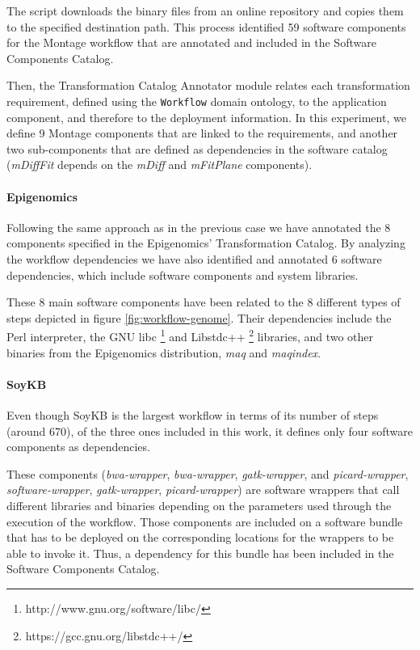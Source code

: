 The script downloads the binary files from an online repository and copies them to the specified destination path. This process identified 59 software components for the Montage workflow that are annotated and included in the Software Components Catalog.

Then, the Transformation Catalog Annotator module relates each transformation requirement, defined using the \texttt{Workflow} domain ontology, to the application component, and therefore to the deployment information.
In this experiment, we define 9 Montage components that are linked to the requirements, and another two sub-components that are defined as dependencies in the software catalog (\emph{mDiffFit} depends on the \emph{mDiff} and \emph{mFitPlane} components).


\paragraph{\textbf{Epigenomics}}

Following the same approach as in the previous case we have annotated the 8 components specified in the Epigenomics' Transformation Catalog. By analyzing the workflow dependencies we have also identified and annotated 6 software dependencies, which include software components and system libraries. 

These 8 main software components have been related to the 8 different types of steps depicted in figure \ref{fig:workflow-genome}.  Their dependencies include the Perl \cite{perl} interpreter, the GNU libc \footnote{http://www.gnu.org/software/libc/} and Libstdc++ \footnote{https://gcc.gnu.org/libstdc++/} libraries, and two other binaries from the Epigenomics  distribution, \emph{maq} and \emph{maqindex}.


\paragraph{\textbf{SoyKB}}

Even though SoyKB is the largest workflow in terms of its number of steps (around 670), of the three ones included in this work, it defines only four software components as dependencies. 

These components (\emph{bwa-wrapper}, \emph{bwa-wrapper},  \emph{gatk-wrapper}, and \emph{picard-wrapper}, \emph{software-wrapper},  \emph{gatk-wrapper}, \emph{picard-wrapper}) are software wrappers that call different libraries and binaries depending on the parameters used through the execution of the workflow. Those components are included on a software bundle that has to be deployed on the corresponding locations for the wrappers to be able to invoke it. Thus, a dependency for this bundle has been included in the Software Components Catalog.


